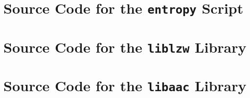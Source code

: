 \documentclass[a4paper, twocolumn]{article}
\begin{document}
    \appendix \onecolumn

    \clearpage
    \section{Source Code for the \texttt{entropy} Script} \label{sec:script}

    

    \section{Source Code for the \texttt{liblzw} Library} \label{sec:liblzw}

    
    

    
    

    
    
    
    
    
    
    

    \section{Source Code for the \texttt{libaac} Library} \label{sec:libaac}

    
    

    
    

    
    
    
    
    
    
\end{document}
